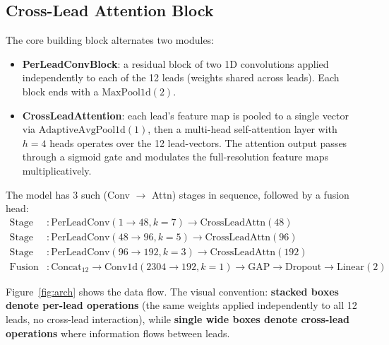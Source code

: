 \documentclass[11pt]{article}
\begin{document}
\subsection{Cross-Lead Attention Block}

The core building block alternates two modules:
\begin{itemize}
\item \textbf{PerLeadConvBlock}: a residual block of two 1D convolutions applied independently to each of the 12 leads (weights shared across leads). Each block ends with a $\text{MaxPool1d}(2)$.
\item \textbf{CrossLeadAttention}: each lead's feature map is pooled to a single vector via $\text{AdaptiveAvgPool1d}(1)$, then a multi-head self-attention layer with $h = 4$ heads operates over the 12 lead-vectors. The attention output passes through a sigmoid gate and modulates the full-resolution feature maps multiplicatively.
\end{itemize}

The model has 3 such (Conv $\to$ Attn) stages in sequence, followed by a fusion head:
\begin{align}
\text{Stage 1}&: \text{PerLeadConv}(1 \to 48, k{=}7) \to \text{CrossLeadAttn}(48) \\
\text{Stage 2}&: \text{PerLeadConv}(48 \to 96, k{=}5) \to \text{CrossLeadAttn}(96) \\
\text{Stage 3}&: \text{PerLeadConv}(96 \to 192, k{=}3) \to \text{CrossLeadAttn}(192) \\
\text{Fusion}&: \text{Concat}_{12} \to \text{Conv1d}(2304 \to 192, k{=}1) \to \text{GAP} \to \text{Dropout} \to \text{Linear}(2)
\end{align}

Figure~\ref{fig:arch} shows the data flow. The visual convention: \textbf{stacked boxes denote per-lead operations} (the same weights applied independently to all 12 leads, no cross-lead interaction), while \textbf{single wide boxes denote cross-lead operations} where information flows between leads.
\end{document}
